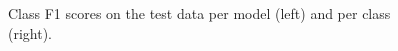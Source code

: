 \documentclass{article}
\begin{document}
\begin{figure}[htbp]
	\begin{center}
		\hspace*{.4in}
	\end{center}
	\caption{\label{fig:class_team_score_sample} Class F1 scores on the test data per model (left) and per class (right).}
\end{figure}
\end{document}
